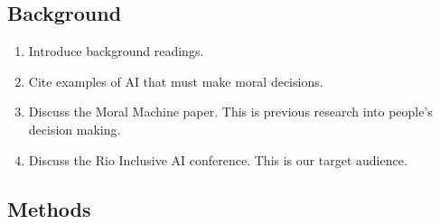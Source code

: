\documentclass{article}
\begin{document}
\subsection{Background}

\begin{enumerate}
    \item Introduce background readings.
    \item Cite examples of AI that must make moral decisions.
    \item Discuss the Moral Machine paper. This is previous research into people's decision making.
    \item Discuss the Rio Inclusive AI conference. This is our target audience.
\end{enumerate}

\subsection{Methods}
\end{document}
